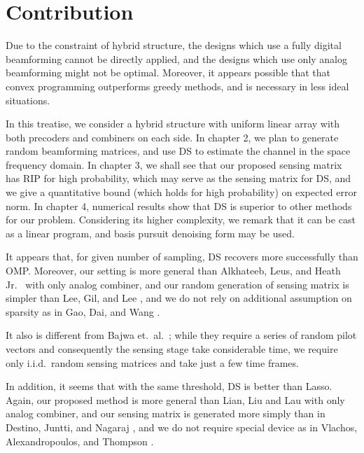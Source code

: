 \section {Contribution}

Due to the constraint of hybrid structure, the designs which use a fully digital beamforming cannot be directly applied, and the designs which use only analog beamforming might not be optimal.
Moreover, it appears possible that that convex programming outperforms greedy methods, and is necessary in less ideal situations.

In this treatise, we consider a hybrid structure with uniform linear array with both precoders and combiners on each side.
In chapter 2, we plan to generate random beamforming matrices, and use DS to estimate the channel in the space frequency domain.
In chapter 3, we shall see that our proposed sensing matrix has RIP for high probability, which may serve as the sensing matrix for DS,
and we give a quantitative bound (which holds for high probability) on expected error norm.
In chapter 4, numerical results show that DS is superior to other methods for our problem.
Considering its higher complexity, we remark that it can be cast as a linear program, and basis pursuit denoising form may be used.

It appears that, for given number of sampling, DS recovers more successfully than OMP.
Moreover, our setting is more general than Alkhateeb, Leus, and Heath Jr.\ \cite {ALH15} with only analog combiner,
and our random generation of sensing matrix is simpler than Lee, Gil, and Lee \cite {LGL16},
and we do not rely on additional assumption on sparsity as in Gao, Dai, and Wang \cite {GDW15}.

It also is different from Bajwa et.\ al.\ \cite {BHS10};
while they require a series of random pilot vectors and consequently the sensing stage take considerable time, we require only i.i.d.\ random sensing matrices and take just a few time frames.

In addition, it seems that with the same threshold, DS is better than Lasso.
Again, our proposed method is more general than Lian, Liu and Lau \cite {LLL17} with only analog combiner,
and our sensing matrix is generated more simply than in Destino, Juntti, and Nagaraj \cite {DJN15},
and we do not require special device as in Vlachos, Alexandropoulos, and Thompson \cite {VAT19}.



